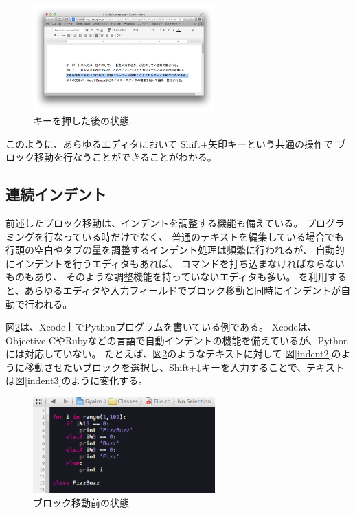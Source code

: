 \begin{figure}[H]
\centerline{\includegraphics[width=70mm,bb=0 0 935 542]{figures/block5.png}}
\caption{キーを押した後の状態.}
\label{move4}
\end{figure}

このように、あらゆるエディタにおいて
Shift+矢印キーという共通の操作で
ブロック移動を行なうことができることがわかる。

\subsection{連続インデント}

前述したブロック移動は、インデントを調整する機能も備えている。
プログラミングを行なっている時だけでなく、
普通のテキストを編集している場合でも
行頭の空白やタブの量を調整するインデント処理は頻繁に行われるが、
自動的にインデントを行うエディタもあれば、
コマンドを打ち込まなければならないものもあり、
そのような調整機能を持っていないエディタも多い。
{\system}を利用すると、あらゆるエディタや入力フィールドでブロック移動と同時にインデントが自動で行われる。

図\ref{indent1}は、Xcode上でPythonプログラムを書いている例である。
Xcodeは、Objective-CやRubyなどの言語で自動インデントの機能を備えているが、Pythonには対応していない。
たとえば、図\ref{indent1}のようなテキストに対して
図\ref{indent2}のように移動させたいブロックを選択し、Shift+↓キーを入力することで、テキストは図\ref{indent3}のように変化する。

\begin{figure}[H]
\centerline{\includegraphics[width=70mm,bb=0 0 360 190]{figures/indent1.png}}
\caption{ブロック移動前の状態}
\label{indent1}
\end{figure}

